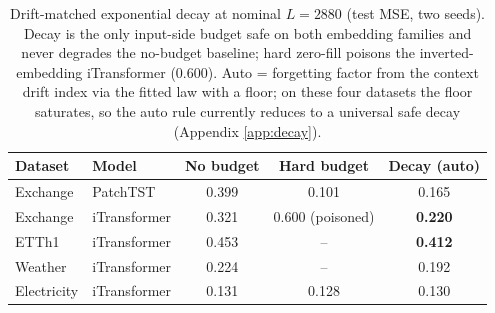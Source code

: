 \begin{table}[t]
\caption{Drift-matched exponential decay at nominal $L{=}2880$ (test MSE, two seeds). Decay is the only input-side budget safe on both embedding families and never degrades the no-budget baseline; hard zero-fill poisons the inverted-embedding iTransformer (0.600). Auto = forgetting factor from the context drift index via the fitted law with a floor; on these four datasets the floor saturates, so the auto rule currently reduces to a universal safe decay (Appendix \ref{app:decay}).}
\label{tab:decay}
\centering\scriptsize
\begin{tabular}{llccc}
\toprule
Dataset & Model & No budget & Hard budget & Decay (auto) \\
\midrule
Exchange & PatchTST & 0.399 & 0.101 & 0.165 \\
Exchange & iTransformer & 0.321 & 0.600 (poisoned) & \textbf{0.220} \\
ETTh1 & iTransformer & 0.453 & -- & \textbf{0.412} \\
Weather & iTransformer & 0.224 & -- & 0.192 \\
Electricity & iTransformer & 0.131 & 0.128 & 0.130 \\
\bottomrule
\end{tabular}
\end{table}
